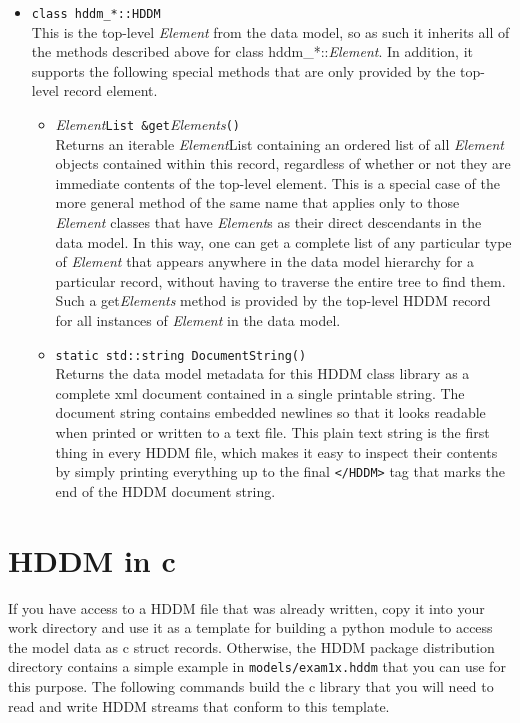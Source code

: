 \documentclass{revtex4}
\begin{document}
\begin{itemize}
\item \texttt{class hddm\_*::HDDM}\\
This is the top-level {\em Element} from the data model, so as such it inherits all
of the methods described above for class hddm\_*::{\em Element}. In addition, it
supports the following special methods that are only provided by the top-level
record element.
\begin{itemize}
\item {\em Element}\texttt{List \&get}{\em Elements}\texttt{()}\\
Returns an iterable {\em Element}List containing an ordered list of all 
{\em Element} objects contained within this record, regardless of whether
or not they are immediate contents of the top-level element. This is a special
case of the more general method of the same name that applies only to those
{\em Element} classes that have {\em Element}s as their direct descendants
in the data model. In this way, one can get a complete
list of any particular type of {\em Element} that appears anywhere in
the data model hierarchy for a particular record, without having to traverse 
the entire tree to find them. Such a get{\em Elements} method is
provided by the top-level HDDM record for all instances of {\em Element} 
in the data model.
\item \texttt{static std::string DocumentString()}\\
Returns the data model metadata for this HDDM class library as a complete xml
document contained in a single printable string. The document string contains
embedded newlines so that it looks readable when printed or written to a text
file. This plain text string is the first thing in every HDDM file, which
makes it easy to inspect their contents by simply printing everything up to
the final \texttt{</HDDM>} tag that marks the end of the HDDM document string.
\end{itemize}
\end{itemize}

\section{HDDM in c}

If you have access to a HDDM file that was already written, copy it into your
work directory and use it as a template for building a python module to access
the model data as c struct records. Otherwise, the HDDM package distribution directory
contains a simple example in \texttt{models/exam1x.hddm} that you can use for
this purpose. The following commands build the c library that you will need
to read and write HDDM streams that conform to this template.
\end{document}
